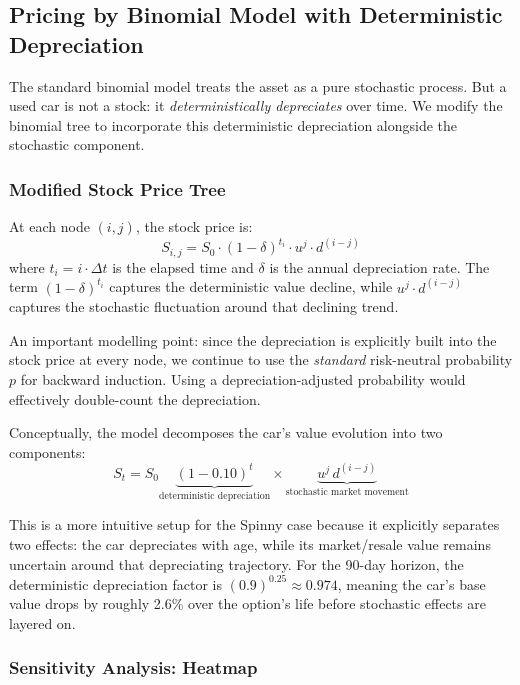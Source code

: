 \documentclass[11pt, a4paper]{article}
\begin{document}
\subsection{Pricing by Binomial Model with Deterministic Depreciation}
\label{sec:pricing_binomial_dep}

The standard binomial model treats the asset as a pure stochastic process. But a used car is not a stock: it \emph{deterministically depreciates} over time. We modify the binomial tree to incorporate this deterministic depreciation alongside the stochastic component.

\subsubsection{Modified Stock Price Tree}

At each node $(i,j)$, the stock price is:
\begin{equation}
    S_{i,j} = S_0 \cdot (1 - \delta)^{t_i} \cdot u^j \cdot d^{(i-j)}
\end{equation}
where $t_i = i \cdot \Delta t$ is the elapsed time and $\delta$ is the annual depreciation rate. The term $(1 - \delta)^{t_i}$ captures the deterministic value decline, while $u^j \cdot d^{(i-j)}$ captures the stochastic fluctuation around that declining trend.

An important modelling point: since the depreciation is explicitly built into the stock price at every node, we continue to use the \emph{standard} risk-neutral probability $p$ for backward induction. Using a depreciation-adjusted probability would effectively double-count the depreciation.

Conceptually, the model decomposes the car's value evolution into two components:
\[
S_t = S_0 \underbrace{(1 - 0.10)^t}_{\text{deterministic depreciation}} \times \underbrace{u^j \, d^{(i-j)}}_{\text{stochastic market movement}}
\]

This is a more intuitive setup for the Spinny case because it explicitly separates two effects: the car depreciates with age, while its market/resale value remains uncertain around that depreciating trajectory. For the 90-day horizon, the deterministic depreciation factor is $(0.9)^{0.25} \approx 0.974$, meaning the car's base value drops by roughly 2.6\% over the option's life before stochastic effects are layered on.

\subsubsection{Sensitivity Analysis: Heatmap}
\end{document}
